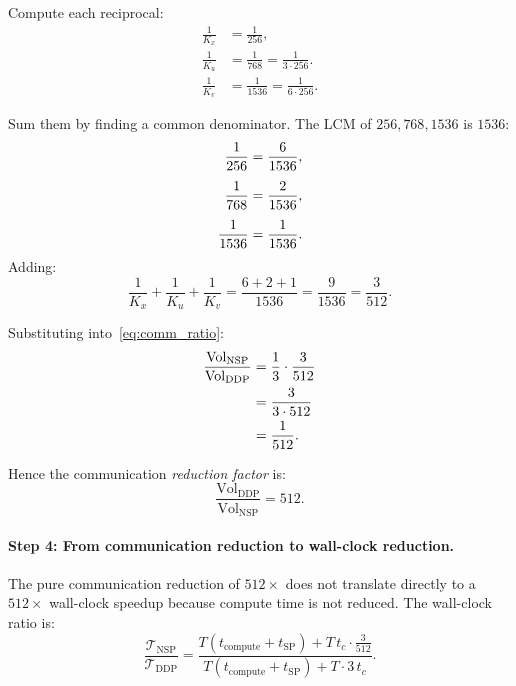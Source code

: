 \documentclass{article}
\begin{document}
Compute each reciprocal:
\begin{align}
\frac{1}{K_x} &= \frac{1}{256}, \label{eq:recip_Kx} \\[4pt]
\frac{1}{K_u} &= \frac{1}{768}
= \frac{1}{3 \cdot 256}. \label{eq:recip_Ku} \\[4pt]
\frac{1}{K_v} &= \frac{1}{1536}
= \frac{1}{6 \cdot 256}. \label{eq:recip_Kv}
\end{align}

Sum them by finding a common denominator. The LCM of $256, 768, 1536$ is
$1536$:
\begin{align}
\frac{1}{256} &= \frac{6}{1536}, \notag \\[4pt]
\frac{1}{768} &= \frac{2}{1536}, \notag \\[4pt]
\frac{1}{1536} &= \frac{1}{1536}. \notag
\end{align}
Adding:
\begin{equation}
\frac{1}{K_x} + \frac{1}{K_u} + \frac{1}{K_v}
= \frac{6 + 2 + 1}{1536}
= \frac{9}{1536}
= \frac{3}{512}.
\label{eq:sum_recip}
\end{equation}

Substituting into~\eqref{eq:comm_ratio}:
\begin{align}
\frac{\text{Vol}_{\text{NSP}}}{\text{Vol}_{\text{DDP}}}
&= \frac{1}{3} \cdot \frac{3}{512}
\notag \\
&= \frac{3}{3 \cdot 512}
\notag \\
&= \frac{1}{512}.
\label{eq:comm_ratio_computed}
\end{align}

Hence the communication \emph{reduction factor} is:
\begin{equation}
\frac{\text{Vol}_{\text{DDP}}}{\text{Vol}_{\text{NSP}}}
= 512.
\label{eq:reduction_pure}
\end{equation}

\paragraph{Step 4: From communication reduction to wall-clock reduction.}

The pure communication reduction of $512\times$ does not translate directly
to a $512\times$ wall-clock speedup because compute time is not reduced.
The wall-clock ratio is:
\begin{equation}
\frac{\mathcal{T}_{\text{NSP}}}{\mathcal{T}_{\text{DDP}}}
= \frac{T(t_{\text{compute}} + t_{\text{SP}})
  + T\,t_c \cdot \frac{3}{512}}
{T(t_{\text{compute}} + t_{\text{SP}}) + T \cdot 3\,t_c}.
\label{eq:wallclock_ratio}
\end{equation}
\end{document}
